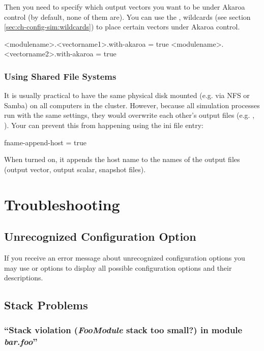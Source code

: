 Then you need to specify which output vectors you want to
be under Akaroa control (by default, none of them are).
You can use the \ttt{*}, \ttt{**} wildcards (see
section \ref{sec:ch-config-sim:wildcards}) to
place certain vectors under Akaroa control.

\begin{inifile}
<modulename>.<vectorname1>.with-akaroa = true
<modulename>.<vectorname2>.with-akaroa = true
\end{inifile}


\subsubsection{Using Shared File Systems}
\label{sec:run-sim:using-shared-filesystems}

It is usually practical to have the same physical disk mounted (e.g. via NFS or Samba)
on all computers in the cluster. However, because all {\opp} simulation
processes run with the same settings, they would overwrite each other's
output files (e.g. , ).
Your can prevent this from happening using the
 ini file entry:

\begin{inifile}
[General]
fname-append-host = true
\end{inifile}

When turned on, it appends the host name to the names of the output
files (output vector, output scalar, snapshot files).



\section{Troubleshooting}

\subsection{Unrecognized Configuration Option}

If you receive an error message about unrecognized configuration
options you may use  or  options
to display all possible configuration options and their descriptions.

\subsection{Stack Problems}

\subsubsection{``Stack violation (\textit{FooModule} stack too small?) in module \textit{bar.foo}''}

